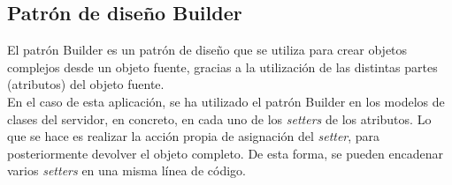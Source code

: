 \subsection{Patrón de diseño Builder}

El patrón Builder \cite{builder} es un patrón de diseño que se utiliza para crear objetos complejos desde un objeto fuente, gracias a la utilización de las distintas partes (atributos) del objeto fuente.
\\

En el caso de esta aplicación, se ha utilizado el patrón Builder en los modelos de clases del servidor, en concreto, en cada uno de los {\it setters} de los atributos. Lo que se hace es realizar la acción propia de asignación del {\it setter}, para posteriormente devolver el objeto completo. De esta forma, se pueden encadenar varios {\it setters} en una misma línea de código.